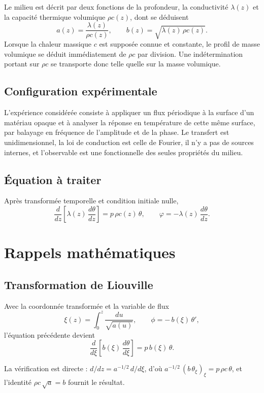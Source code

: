 \documentclass[11pt,a4paper]{article}
\begin{document}
Le milieu est décrit par deux fonctions de la profondeur, la conductivité $\lambda(z)$ et la capacité
thermique volumique $\rho c(z)$, dont se déduisent
\[ a(z) = \frac{\lambda(z)}{\rho c(z)} , \qquad b(z) = \sqrt{\lambda(z)\,\rho c(z)} . \]
Lorsque la chaleur massique $c$ est supposée connue et constante, le profil de masse volumique se déduit
immédiatement de $\rho c$ par division. Une indétermination portant sur $\rho c$ se transporte donc
telle quelle sur la masse volumique.

\subsection{Configuration expérimentale}

L'expérience considérée consiste à appliquer un flux périodique à la surface d'un matériau opaque et à
analyser la réponse en température de cette même surface, par balayage en fréquence de l'amplitude et
de la phase. Le transfert est unidimensionnel, la loi de conduction est celle de Fourier, il n'y a pas
de sources internes, et l'observable est une fonctionnelle des seules propriétés du milieu.

\subsection{Équation à traiter}

Après transformée temporelle et condition initiale nulle,
\[ \frac{d}{dz}\!\left[\lambda(z)\,\frac{d\theta}{dz}\right] = p\,\rho c(z)\,\theta ,
\qquad \varphi = -\lambda(z)\,\frac{d\theta}{dz} . \]

\section{Rappels mathématiques}

\subsection{Transformation de Liouville}

Avec la coordonnée transformée et la variable de flux
\[ \xi(z) = \int_{0}^{z}\frac{du}{\sqrt{a(u)}} , \qquad \phi = -\,b(\xi)\,\theta' , \]
l'équation précédente devient
\[ \frac{d}{d\xi}\!\left[b(\xi)\,\frac{d\theta}{d\xi}\right] = p\,b(\xi)\,\theta . \]

La vérification est directe : $d/dz = a^{-1/2}\,d/d\xi$, d'où
$a^{-1/2}\,(b\,\theta_{\xi})_{\xi} = p\,\rho c\,\theta$, et l'identité $\rho c\,\sqrt{a} = b$ fournit le
résultat.
\end{document}
